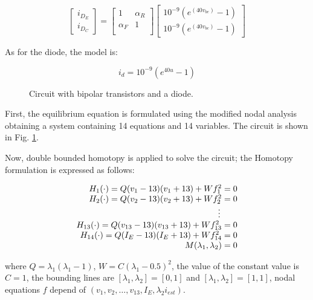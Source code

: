 \documentclass[conference,letterpaper,twocolumn]{IEEEtran}
\begin{document}
\begin{displaymath}
\left[ \begin{array}{c}
i_{D_E} \\
i_{D_C}
\end{array}\right] =
\left[ \begin{array}{cc} 1  & \alpha_R \\
\alpha_F & 1 \\
\end{array}\right] \left[ \begin{array}{c}
10^{-9}(e^{(40v_{be})} - 1) \\
10^{-9}(e^{(40v_{bc})} - 1)
\end{array}\right]
\end{displaymath}

As for the diode, the model is:

\begin{displaymath}
i_d=10^{-9}(e^{40u} - 1)
\end{displaymath}

\begin{figure}[hbtp]
\centerline{
\epsfxsize=75mm
}
\caption{Circuit with bipolar transistors and a diode.}
\label{yamamuracircuito}
\end{figure}

First, the equilibrium equation is formulated using the modified nodal analysis obtaining a system containing 14 equations and 14 variables. The circuit is shown in Fig. \ref{yamamuracircuito}.

Now, double bounded homotopy is applied to solve the circuit; the Homotopy formulation is expressed as follows:

\begin{displaymath}
{\small
\begin{array}{r}
H_1(\cdot)=Q(v_1-13)(v_1+13)+ W f_1^2=0\\
H_2(\cdot)=Q(v_2-13)(v_2+13)+ W f_2^2=0\\
\vdots \qquad \\
H_{13}(\cdot)=Q(v_{13}-13)(v_{13}+13)+ W f_{13}^2=0\\
H_{14}(\cdot)=Q(I_E-13)(I_E+13)+ W f_{14}^2=0\\
M(\lambda_1,\lambda_2)=0
\end{array}}
\end{displaymath}


where $Q=\lambda_1(\lambda_1-1)$, $W=C(\lambda_1-0.5)^2 $, the value of the constant value is $C=1$, the bounding lines are $[\lambda_1,\lambda_2]=[0,1]$ and $[\lambda_1,\lambda_2]=[1,1]$, nodal equations $f$ depend of $(v_1,v_2,\hdots,v_{13},I_E,\lambda_2i_{est})$.
\end{document}
